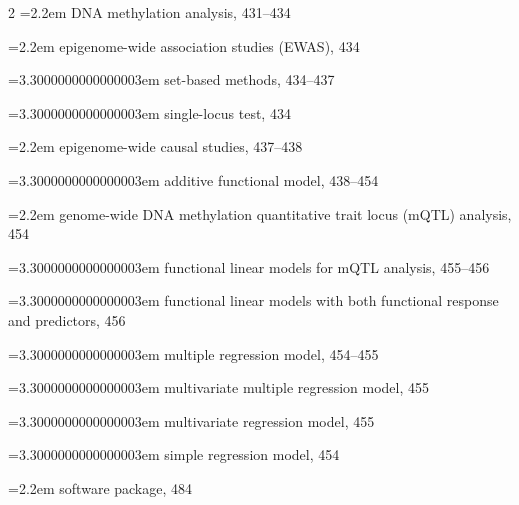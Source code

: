 \begin{multicols}{2}
\noindent\hangindent=2.2em \hspace*{1.1em}DNA methylation analysis, 431--434\par
\noindent\hangindent=2.2em \hspace*{1.1em}epigenome-wide association studies (EWAS), 434\par
\noindent\hangindent=3.3000000000000003em \hspace*{2.2em}set-based methods, 434--437\par
\noindent\hangindent=3.3000000000000003em \hspace*{2.2em}single-locus test, 434\par
\noindent\hangindent=2.2em \hspace*{1.1em}epigenome-wide causal studies, 437--438\par
\noindent\hangindent=3.3000000000000003em \hspace*{2.2em}additive functional model, 438--454\par
\noindent\hangindent=2.2em \hspace*{1.1em}genome-wide DNA methylation quantitative trait locus (mQTL) analysis, 454\par
\noindent\hangindent=3.3000000000000003em \hspace*{2.2em}functional linear models for mQTL analysis, 455--456\par
\noindent\hangindent=3.3000000000000003em \hspace*{2.2em}functional linear models with both functional response and predictors, 456\par
\noindent\hangindent=3.3000000000000003em \hspace*{2.2em}multiple regression model, 454--455\par
\noindent\hangindent=3.3000000000000003em \hspace*{2.2em}multivariate multiple regression model, 455\par
\noindent\hangindent=3.3000000000000003em \hspace*{2.2em}multivariate regression model, 455\par
\noindent\hangindent=3.3000000000000003em \hspace*{2.2em}simple regression model, 454\par
\noindent\hangindent=2.2em \hspace*{1.1em}software package, 484\par

\end{multicols}

